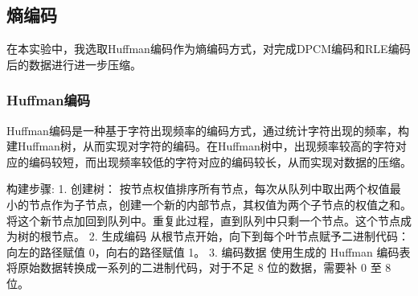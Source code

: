 \documentclass{article}
\begin{document}
\subsection{熵编码}

在本实验中，我选取Huffman编码作为熵编码方式，对完成DPCM编码和RLE编码后的数据进行进一步压缩。

\subsubsection{Huffman编码}

Huffman编码是一种基于字符出现频率的编码方式，通过统计字符出现的频率，构建Huffman树，从而实现对字符的编码。在Huffman树中，出现频率较高的字符对应的编码较短，而出现频率较低的字符对应的编码较长，从而实现对数据的压缩。

构建步骤:
1. 创建树：
按节点权值排序所有节点，每次从队列中取出两个权值最小的节点作为子节点，创建一个新的内部节点，其权值为两个子节点的权值之和。
将这个新节点加回到队列中。重复此过程，直到队列中只剩一个节点。这个节点成为树的根节点。
2. 生成编码
从根节点开始，向下到每个叶节点赋予二进制代码：向左的路径赋值 0，向右的路径赋值 1。
3. 编码数据
使用生成的 Huffman 编码表将原始数据转换成一系列的二进制代码，对于不足 8 位的数据，需要补 0 至 8 位。
\end{document}
